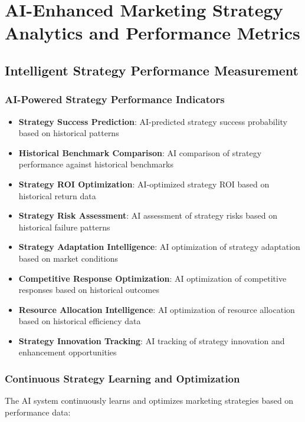 \section{AI-Enhanced Marketing Strategy Analytics and Performance Metrics}

\subsection{Intelligent Strategy Performance Measurement}

\subsubsection{AI-Powered Strategy Performance Indicators}

\begin{itemize}
    \item \textbf{Strategy Success Prediction}: AI-predicted strategy success probability based on historical patterns
    \item \textbf{Historical Benchmark Comparison}: AI comparison of strategy performance against historical benchmarks
    \item \textbf{Strategy ROI Optimization}: AI-optimized strategy ROI based on historical return data
    \item \textbf{Strategy Risk Assessment}: AI assessment of strategy risks based on historical failure patterns
    \item \textbf{Strategy Adaptation Intelligence}: AI optimization of strategy adaptation based on market conditions
    \item \textbf{Competitive Response Optimization}: AI optimization of competitive responses based on historical outcomes
    \item \textbf{Resource Allocation Intelligence}: AI optimization of resource allocation based on historical efficiency data
    \item \textbf{Strategy Innovation Tracking}: AI tracking of strategy innovation and enhancement opportunities
\end{itemize}

\subsubsection{Continuous Strategy Learning and Optimization}

The AI system continuously learns and optimizes marketing strategies based on performance data:

